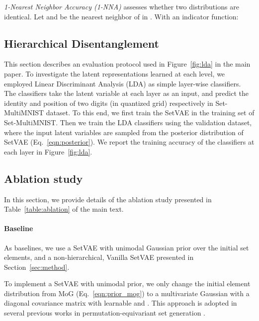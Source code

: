 \documentclass[final]{arxiv/cvpr}
\begin{document}
\emph{1-Nearest Neighbor Accuracy (1-NNA)} assesses whether two distributions are identical.
Let  and  be the nearest neighbor of  in . With  an indicator function:


\subsection{Hierarchical Disentanglement}
This section describes an evaluation protocol used in Figure~\ref{fig:lda} in the main paper.
To investigate the latent representations learned at each level, we employed Linear Discriminant Analysis (LDA) as simple layer-wise classifiers.
The classifiers take the latent variable at each layer  as an input, and predict the identity and position of two digits (in  quantized grid) respectively in Set-MultiMNIST dataset.
To this end, we first train the SetVAE in the training set of Set-MultiMNIST.
Then we train the LDA classifiers using the validation dataset, where the input latent variables are sampled from the posterior distribution of SetVAE (Eq.~\eqref{eqn:posterior}). 
We report the training accuracy of the classifiers at each layer in Figure~\ref{fig:lda}.

\subsection{Ablation study}
In this section, we provide details of the ablation study presented in Table~\ref{table:ablation} of the main text.

\paragraph{Baseline}
As baselines, we use a SetVAE with unimodal Gaussian prior over the initial set elements, and a non-hierarchical, Vanilla SetVAE presented in Section~\ref{sec:method}.

To implement a SetVAE with unimodal prior, we only change the initial element distribution  from MoG (Eq.~\eqref{eqn:prior_mog}) to a multivariate Gaussian with a diagonal covariance matrix  with learnable  and .
This approach is adopted in several previous works in permutation-equivariant set generation \cite{yang2019pointflow, kosiorek2020conditional, locatello2020objectcentric}.
\end{document}
